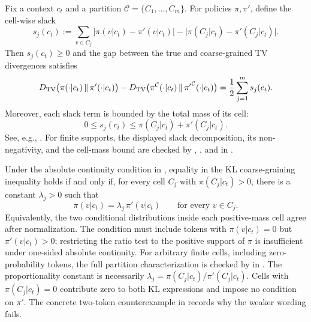 \begin{remark}
\label{rem:tv-gap}
Fix a context $c_t$ and a partition $\mathcal{C}=\{C_1,\ldots,C_m\}$. For policies $\pi,\pi'$, define the cell-wise slack
\begin{equation*}
    s_j(c_t)
    :=
    \sum_{v\in C_j} \big|\pi(v|c_t)-\pi'(v|c_t)\big|
    -
    \big|\pi(C_j|c_t)-\pi'(C_j|c_t)\big|.
\end{equation*}
Then $s_j(c_t)\ge 0$ and the gap between the true and coarse-grained TV divergences satisfies
\begin{equation*}
    D_{\mathrm{TV}}\big(\pi(\cdot|c_t)\,\|\,\pi'(\cdot|c_t)\big)
    -
    D_{\mathrm{TV}}\big(\pi^{\mathcal{C}}(\cdot|c_t)\,\|\,{\pi'}^{\mathcal{C}}(\cdot|c_t)\big)
    =
    \frac{1}{2}\sum_{j=1}^{m} s_j(c_t).
\end{equation*}
Moreover, each slack term is bounded by the total mass of its cell:
\begin{equation*}
    0 \le s_j(c_t) \le \pi(C_j|c_t) + \pi'(C_j|c_t).
\end{equation*}
See, e.g., \citet{qi2026rethinkingtrustregionllm}.
For finite supports, the displayed slack decomposition, its non-negativity,
and the cell-mass bound are checked by
,
, and
 in
.
\end{remark}

\begin{remark}
\label{rem:kl-equality}
Under the absolute continuity condition in , equality in the KL coarse-graining inequality holds if and only
if, for every cell $C_j$ with $\pi(C_j|c_t)>0$, there is a constant $\lambda_j>0$ such that
\begin{equation*}
    \pi(v|c_t)=\lambda_j\,\pi'(v|c_t)
    \qquad\text{for every }v\in C_j.
\end{equation*}
Equivalently, the two conditional distributions inside each positive-mass cell agree after normalization. The condition must
include tokens with $\pi(v|c_t)=0$ but $\pi'(v|c_t)>0$; restricting the ratio test to the positive support of $\pi$ is insufficient under one-sided absolute continuity.
For arbitrary finite cells, including zero-probability tokens, the full partition characterization is checked by
 in .
The proportionality constant is necessarily $\lambda_j=\pi(C_j|c_t)/\pi'(C_j|c_t)$.
Cells with $\pi(C_j|c_t)=0$ contribute zero to both KL expressions and impose no condition on $\pi'$.
The concrete two-token counterexample
 in 
records why the weaker wording fails.
\end{remark}

